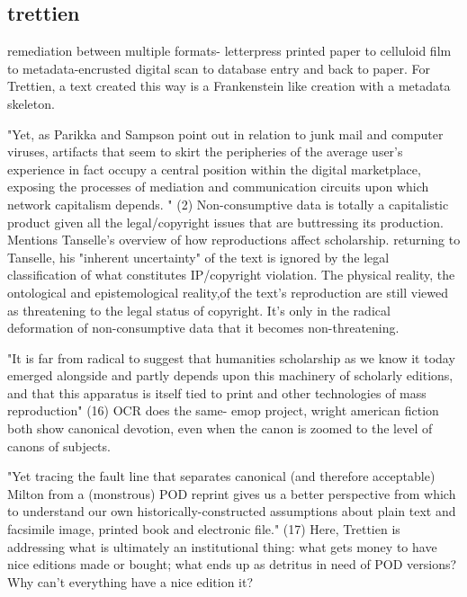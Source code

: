 \documentclass[course, english]{Notes}
\begin{document}
\subsection{trettien}
\begin{outline}
\1 remediation between multiple formats- letterpress printed paper to celluloid film to metadata-encrusted digital scan to database entry and back to paper. For Trettien, a text created this way is a Frankenstein like creation with a metadata skeleton. 

\1 "Yet, as Parikka and Sampson point out in relation to junk mail and computer viruses, artifacts that seem to skirt the peripheries of the average user's experience in fact occupy a central position within the digital marketplace, exposing the processes of mediation and communication circuits upon which network capitalism depends. " (2)
	\2 Non-consumptive data is totally a capitalistic product given all the legal/copyright issues that are buttressing its production. 
\1 Mentions Tanselle's overview of how reproductions affect scholarship.
	\2 returning to Tanselle, his "inherent uncertainty" of the text is ignored by the legal classification of what constitutes IP/copyright violation. The physical reality, the ontological and epistemological reality,of the text's reproduction are still viewed as threatening to the legal status of copyright. 
		\3 It's only in the radical deformation of non-consumptive data that it becomes non-threatening. 

\1 "It is far from radical to suggest that humanities scholarship as we know it today emerged alongside and partly depends upon this machinery of scholarly editions, and that this apparatus is itself tied to print and other technologies of mass reproduction" (16)
	\2 OCR does the same- emop project, wright american fiction both show canonical devotion, even when the canon is zoomed to the level of canons of subjects.

\1 "Yet tracing the fault line that separates canonical (and therefore acceptable) Milton from a (monstrous) POD reprint gives us a better perspective from which to understand our own historically-constructed assumptions about plain text and facsimile image, printed book and electronic file." (17)
	\2 Here, Trettien is addressing what is ultimately an institutional thing: what gets money to have nice editions made or bought; what ends up as detritus in need of POD versions? Why can't everything have a nice edition it?


\end{outline}
\end{document}
